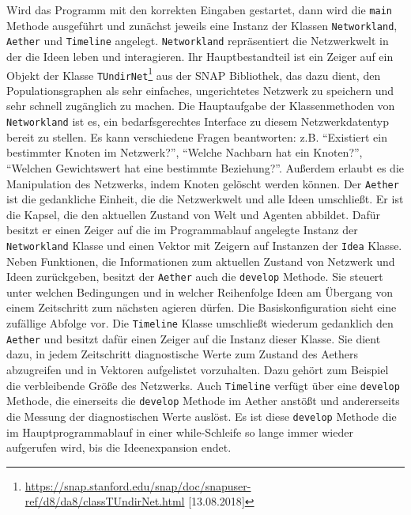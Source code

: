 \documentclass[openany,twoside,twocolumn]{book}
\let\rmarkdownfootnote\footnote%
\def\footnote{\protect\rmarkdownfootnote}
\begin{document}
Wird das Programm mit den korrekten Eingaben gestartet, dann wird die
\texttt{main} Methode ausgeführt und zunächst jeweils eine Instanz der
Klassen \texttt{Networkland}, \texttt{Aether} und \texttt{Timeline}
angelegt. \texttt{Networkland} repräsentiert die Netzwerkwelt in der die
Ideen leben und interagieren. Ihr Hauptbestandteil ist ein Zeiger auf
ein Objekt der Klasse \texttt{TUndirNet}\footnote{\url{https://snap.stanford.edu/snap/doc/snapuser-ref/d8/da8/classTUndirNet.html}
  {[}13.08.2018{]}} aus der SNAP Bibliothek, das dazu dient, den
Populationsgraphen als sehr einfaches, ungerichtetes Netzwerk zu
speichern und sehr schnell zugänglich zu machen. Die Hauptaufgabe der
Klassenmethoden von \texttt{Networkland} ist es, ein bedarfsgerechtes
Interface zu diesem Netzwerkdatentyp bereit zu stellen. Es kann
verschiedene Fragen beantworten: z.B. ``Existiert ein bestimmter Knoten
im Netzwerk?'', ``Welche Nachbarn hat ein Knoten?'', ``Welchen
Gewichtswert hat eine bestimmte Beziehung?''. Außerdem erlaubt es die
Manipulation des Netzwerks, indem Knoten gelöscht werden können. Der
\texttt{Aether} ist die gedankliche Einheit, die die Netzwerkwelt und
alle Ideen umschließt. Er ist die Kapsel, die den aktuellen Zustand von
Welt und Agenten abbildet. Dafür besitzt er einen Zeiger auf die im
Programmablauf angelegte Instanz der \texttt{Networkland} Klasse und
einen Vektor mit Zeigern auf Instanzen der \texttt{Idea} Klasse. Neben
Funktionen, die Informationen zum aktuellen Zustand von Netzwerk und
Ideen zurückgeben, besitzt der \texttt{Aether} auch die \texttt{develop}
Methode. Sie steuert unter welchen Bedingungen und in welcher
Reihenfolge Ideen am Übergang von einem Zeitschritt zum nächsten agieren
dürfen. Die Basiskonfiguration sieht eine zufällige Abfolge vor. Die
\texttt{Timeline} Klasse umschließt wiederum gedanklich den
\texttt{Aether} und besitzt dafür einen Zeiger auf die Instanz dieser
Klasse. Sie dient dazu, in jedem Zeitschritt diagnostische Werte zum
Zustand des Aethers abzugreifen und in Vektoren aufgelistet vorzuhalten.
Dazu gehört zum Beispiel die verbleibende Größe des Netzwerks. Auch
\texttt{Timeline} verfügt über eine \texttt{develop} Methode, die
einerseits die \texttt{develop} Methode im Aether anstößt und
andererseits die Messung der diagnostischen Werte auslöst. Es ist diese
\texttt{develop} Methode die im Hauptprogrammablauf in einer
while-Schleife so lange immer wieder aufgerufen wird, bis die
Ideenexpansion endet.
\end{document}
